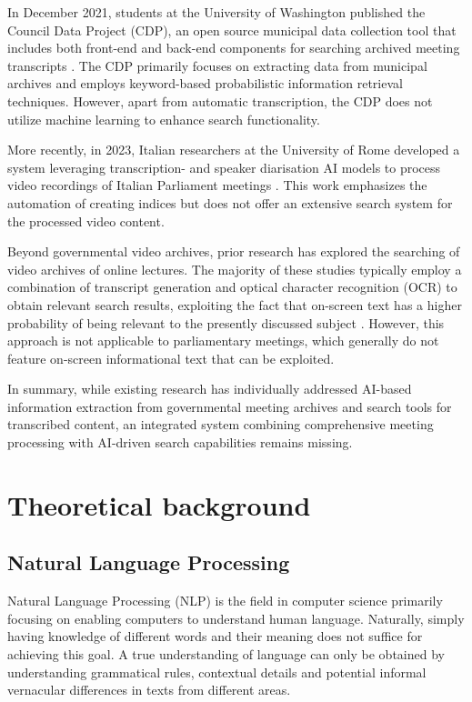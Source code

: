 \documentclass[twoside]{uva-inf-bachelor-thesis}
\begin{document}
In December 2021, students at the University of Washington published the Council Data Project (CDP), an open source municipal data collection tool that includes both front-end and back-end components for searching archived meeting transcripts \cite{Brown2021Council}. 
The CDP primarily focuses on extracting data from municipal archives and employs keyword-based probabilistic information retrieval techniques. However, apart from automatic transcription, the CDP does not utilize machine learning to enhance search functionality.

More recently, in 2023, Italian researchers at the University of Rome developed a system leveraging transcription- and speaker diarisation AI models to process video recordings of Italian Parliament meetings \cite{bertillo2023enhancing}.  This work emphasizes the automation of creating indices but does not offer an extensive search system for the processed video content.

Beyond governmental video archives, prior research has explored the searching of video archives of online lectures. The majority of these studies typically employ a combination of transcript generation and optical character recognition (OCR) to obtain relevant search results, exploiting the fact that on-screen text has a higher probability of being relevant to the presently discussed subject \cite{Adcock10, yang14}. 
However, this approach is not applicable to parliamentary meetings, which generally do not feature on-screen informational text that can be exploited. 

In summary, while existing research has individually addressed AI-based information extraction from governmental meeting archives and search tools for transcribed content, an integrated system combining comprehensive meeting processing with AI-driven search capabilities remains missing.

\chapter{Theoretical background}

\section{Natural Language Processing}
Natural Language Processing (NLP) is the field in computer science primarily focusing on enabling computers to understand human language. Naturally, simply having knowledge of different words and their meaning does not suffice for achieving this goal. A true understanding of language can only be obtained by understanding grammatical rules, contextual details and potential informal vernacular differences in texts from different areas.
\end{document}
